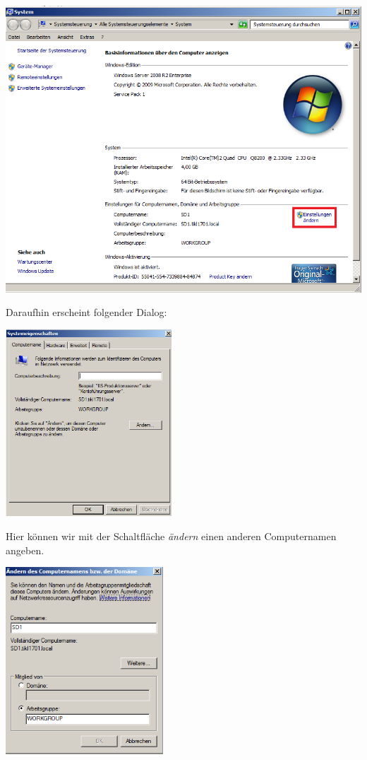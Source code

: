 \documentclass[12pt,a4paper,titlepage]{scrartcl} %
\begin{document}
	\begin{center}\includegraphics[width=14cm]{Bilder/001(Kasten)}\\ \end{center}

Daraufhin erscheint folgender Dialog:\\

	\begin{center}\includegraphics[height=7cm]{Bilder/002}\\ \end{center}
		
Hier können wir mit der Schaltfläche \emph{ändern} einen anderen Computernamen angeben.\\

	\begin{center}\includegraphics[height=7cm]{Bilder/003}\\ \end{center}
		
\end{document}
